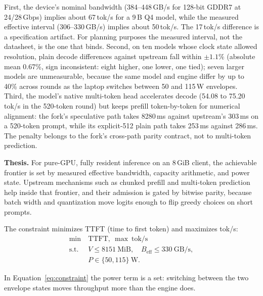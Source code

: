 \documentclass[letterpaper,twocolumn,10pt]{article}
\begin{document}
First, the device's nominal bandwidth (384--448\,GB/s for 128-bit GDDR7 at
24/28\,Gbps) implies about 67\,tok/s for a 9\,B Q4 model, while the measured
effective interval (306--330\,GB/s) implies about 50\,tok/s. The 17\,tok/s
difference is a specification artifact. For planning purposes the measured
interval, not the datasheet, is the one that binds. Second, on ten models whose clock
state allowed resolution, plain decode differences against upstream fall
within $\pm1.1\%$ (absolute mean 0.67\%, sign inconsistent: eight higher, one
lower, one tied); seven larger models are unmeasurable, because the same model
and engine differ by up to 40\% across rounds as the laptop switches between
50 and 115\,W envelopes. Third, the model's native multi-token head accelerates
decode (54.08 to 75.20\,tok/s in the 520-token round) but keeps prefill
token-by-token for numerical alignment: the fork's speculative path takes
8280\,ms against upstream's 303\,ms on a 520-token prompt, while its
explicit-512 plain path takes 253\,ms against 286\,ms. The penalty belongs to
the fork's cross-path parity contract, not to multi-token prediction.

\textbf{Thesis.} For pure-GPU, fully resident inference on an 8\,GiB client,
the achievable frontier is set by measured effective bandwidth, capacity
arithmetic, and power state. Upstream mechanisms such as chunked prefill and
multi-token prediction help inside that frontier, and their admission is
gated by bitwise parity, because batch width and quantization move logits
enough to flip greedy choices on short prompts.

The constraint minimizes TTFT (time to first token) and maximizes tok/s:
\begin{equation}
\begin{aligned}
\min\ & \mathrm{TTFT},\ \max\ \mathrm{tok/s}\\
\text{s.t.}\ & V \le 8151\ \mathrm{MiB},\quad
B_{\mathrm{eff}} \le 330\ \mathrm{GB/s},\\
& P \in \{50,115\}\ \mathrm{W}.
\end{aligned}
\label{eq:constraint}
\end{equation}

In Equation~\ref{eq:constraint} the power term is a set: switching between the
two envelope states moves throughput more than the engine does.
\end{document}
